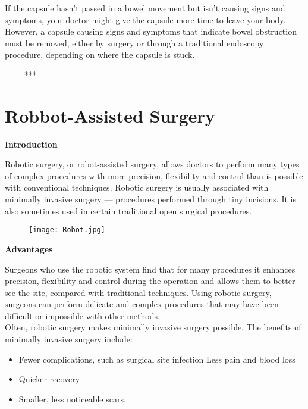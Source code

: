 \documentclass[12pt]{article}
\begin{document}
If the capsule hasn't passed in a bowel movement but isn't causing signs and symptoms, your doctor might give the capsule more time to leave your body. However, a capsule causing signs and symptoms that indicate bowel obstruction must be removed, either by surgery or through a traditional endoscopy procedure, depending on where the capsule is stuck.


\vspace{1.5cm}

\centering\huge-------***------



\pagebreak
\section{\centering\Huge\textbf{Robbot-Assisted Surgery}}

\vspace{0.5cm}

\LARGE\flushleft\textbf{Introduction}

\large\flushleft Robotic surgery, or robot-assisted surgery, allows doctors to perform many types of complex procedures with more precision, flexibility and control than is possible with conventional techniques. Robotic surgery is usually associated with minimally invasive surgery — procedures performed through tiny incisions. It is also sometimes used in certain traditional open surgical procedures.

\vspace{1cm}

\begin{figure}[h]
\centering
\texttt{[image: Robot.jpg]}
\end{figure}

\pagebreak

\LARGE\flushleft\textbf{Advantages}

\large\flushleft Surgeons who use the robotic system find that for many procedures it enhances precision, flexibility and control during the operation and allows them to better see the site, compared with traditional techniques. Using robotic surgery, surgeons can perform delicate and complex procedures that may have been difficult or impossible with other methods.\\

\vspace{0.4cm}
Often, robotic surgery makes minimally invasive surgery possible. The benefits of minimally invasive surgery include:\\
\begin{itemize}


\item Fewer complications, such as surgical site infection
Less pain and blood loss\\
\item Quicker recovery\\
\item Smaller, less noticeable scars.\\

\end{itemize}
\end{document}
